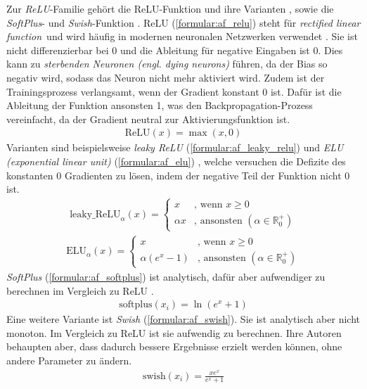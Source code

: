 \newline
\newline
Zur \textit{ReLU}-Familie \cite{apicella2021survey} gehört die ReLU-Funktion \cite{glorot2011deep, konda2014zero, elfwing2018sigmoid, alcaide2018swish} und
ihre Varianten \cite{maas2013rectifier}, sowie die \textit{SoftPlus}- \cite{dugas2001incorporating} und \textit{Swish}-Funktion \cite{ramachandran2017searching}.
ReLU (\ref{formular:af_relu}) steht für \glqq\textit{rectified linear function}\grqq\ und wird häufig in modernen neuronalen Netzwerken verwendet \cite{apicella2021survey}.
Sie ist nicht differenzierbar bei 0 und die Ableitung für negative Eingaben ist 0.
Dies kann zu \textit{sterbenden Neuronen (engl. dying neurons)} führen, da der Bias so negativ wird, sodass das Neuron nicht mehr aktiviert wird.
Zudem ist der Trainingsprozess verlangsamt, wenn der Gradient konstant 0 ist.
Dafür ist die Ableitung der Funktion ansonsten 1, was den Backpropagation-Prozess vereinfacht, da der Gradient neutral zur Aktivierungsfunktion ist.
\begin{align}
    \label{formular:af_relu}
    \text{ReLU}(x) = \max(x, 0)
\end{align}
Varianten sind beispielsweise \textit{leaky ReLU} \cite{maas2013rectifier} (\ref{formular:af_leaky_relu}) und \textit{ELU (exponential linear unit)} (\ref{formular:af_elu})
\cite{clevert2015fast}, welche versuchen die Defizite des konstanten 0 Gradienten zu lösen, indem der negative Teil der Funktion nicht 0 ist.
\begin{align}
    \label{formular:af_leaky_relu}
    \text{leaky\_ReLU}_{\alpha}(x) = \begin{cases}
                               x & \text{, wenn } x \geq 0\\
                               \alpha x & \text{, ansonsten } (\alpha\in \mathbb{R}_{0}^{+})
    \end{cases}
\end{align}
\begin{align}
    \label{formular:af_elu}
    \text{ELU}_{\alpha}(x) = \begin{cases}
                                 x & \text{, wenn } x \geq 0\\
                                 \alpha(e^{x} - 1) & \text{, ansonsten } (\alpha\in \mathbb{R}_{0}^{+})
    \end{cases}
\end{align}
\textit{SoftPlus} (\ref{formular:af_softplus}) ist analytisch, dafür aber aufwendiger zu berechnen im Vergleich zu ReLU \cite{apicella2021survey}.
\begin{align}
    \label{formular:af_softplus}
    \text{softplus}(x_i) = \ln(e^x + 1)
\end{align}
Eine weitere Variante ist \textit{Swish} \cite{ramachandran2017searching} (\ref{formular:af_swish}).
Sie ist analytisch aber nicht monoton.
Im Vergleich zu ReLU ist sie aufwendig zu berechnen.
Ihre Autoren behaupten aber, dass dadurch bessere Ergebnisse erzielt werden können, ohne andere Parameter zu ändern.
\begin{align}
    \label{formular:af_swish}
    \text{swish}(x_i) = \frac{xe^x}{e^x + 1}
\end{align}